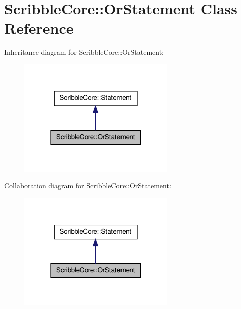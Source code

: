 \hypertarget{class_scribble_core_1_1_or_statement}{\section{Scribble\-Core\-:\-:Or\-Statement Class Reference}
\label{class_scribble_core_1_1_or_statement}
}


Inheritance diagram for Scribble\-Core\-:\-:Or\-Statement\-:
\nopagebreak
\begin{figure}[H]
\begin{center}
\leavevmode
\includegraphics[width=214pt]{class_scribble_core_1_1_or_statement__inherit__graph}
\end{center}
\end{figure}


Collaboration diagram for Scribble\-Core\-:\-:Or\-Statement\-:
\nopagebreak
\begin{figure}[H]
\begin{center}
\leavevmode
\includegraphics[width=214pt]{class_scribble_core_1_1_or_statement__coll__graph}
\end{center}
\end{figure}
